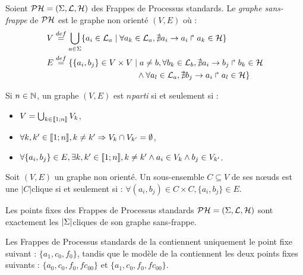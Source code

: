 \begin{definition}
  Soient $\mathcal{PH} = (\Sigma, \mathcal{L}, \mathcal{H})$ des Frappes de Processus standards.
  Le \emph{graphe sans-frappe} de $\mathcal{PH}$ est le graphe non orienté $(V, E)$ où :
  \begin{align*}
    V &\stackrel{def}= \bigcup_{a \in \Sigma} \{ a_i \in \mathcal{L}_a \mid
      \forall a_k \in \mathcal{L}_a, \nexists a_i\rightarrow a_i\Rsh a_k \in \mathcal{H} \} \\
    E &\stackrel{def}= \{ \{a_i, b_j\} \in V \times V \mid
      a \neq b, \forall b_k \in \mathcal{L}_b, \nexists a_i\rightarrow b_j\Rsh b_k \in \mathcal{H} \\
    & \qquad\qquad\qquad\qquad\qquad
      \wedge \forall a_l \in \mathcal{L}_a, \nexists b_j\rightarrow a_i\Rsh a_l \in \mathcal{H} \}
  \end{align*}
\end{definition}

\begin{definition}
  Si $n \in \mathbb{N}$, un graphe $(V, E)$ est \emph{$n$\nbd parti} si et seulement si :
  \begin{itemize}
    \item $V = \bigcup_{k \in \mathopen{\llbracket}1\mathclose{};n\mathclose{\rrbracket}} V_k$,
    \item $\forall k, k' \in \mathopen{\llbracket}1\mathclose{};n\mathclose{\rrbracket}, k \neq k' \Rightarrow V_k \cap V_{k'} = \emptyset$,
    \item $\forall \{a_i, b_j\} \in E, \exists k, k' \in \mathopen{\llbracket}1\mathclose{};n\mathclose{\rrbracket}, k \neq k' \wedge a_i \in V_k \wedge b_j \in V_{k'}$.
  \end{itemize}
\end{definition}

\begin{definition}
  Soit $(V, E)$ un graphe non orienté.
  Un sous-ensemble $C \subseteq V$ de ses nœuds est une $|C|$\nbd clique si et seulement si :
  $\forall (a_i, b_j) \in C \times C, \{a_i, b_j\} \in E$.
\end{definition}

\begin{theorem}
  Les points fixes des Frappes de Processus standards $\mathcal{PH} = (\Sigma, \mathcal{L}, \mathcal{H})$
  sont exactement les $|\Sigma|$\nbd cliques de son graphe sans-frappe.
\end{theorem}

\begin{example}
  Les Frappes de Processus standards de la 
  contiennent uniquement le point fixe suivant :
  $\{ a_1, c_0, f_0 \}$,
  tandis que le modèle de la 
  contiennent les deux points fixes suivants :
  $\{ a_0, c_0, f_0, fc_{00} \}$ et $\{ a_1, c_0, f_0, fc_{00} \}$.
\end{example}

